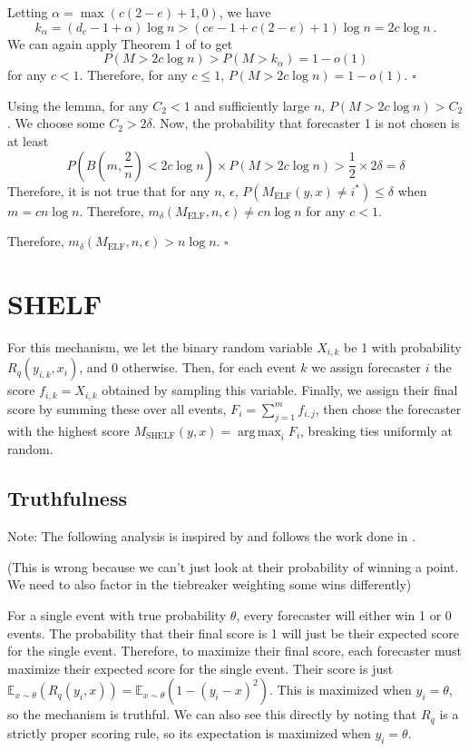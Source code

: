 \documentclass[letterpaper,12pt]{article}
\DeclareMathOperator*{\argmax}{arg\,max}
\newcommand{\E}{\mathbb{E}}
\newcommand{\1}{\mathbbm{1}}
\newcommand*{\QED}{\hfill\ensuremath{\square}}%
\newcommand{\elf}{M_{\mathrm{ELF}}}
\newcommand{\shelf}{M_{\mathrm{SHELF}}}
\begin{document}
Letting $\alpha = \max (c (2-e) + 1, 0)$, we have
\[
k_\alpha = (d_c - 1 + \alpha) \log n > (ce - 1 + c (2-e) + 1) \log n = 2c \log n \:.
\]
We can again apply Theorem 1 of \citet{raab1998balls} to get
\[
P(M > 2 c \log n) > P(M > k_\alpha) = 1 - o(1)
\]
for any $c < 1$. Therefore, for any $c \leq 1$, $P(M > 2 c \log n) = 1 - o(1)$. \hfill \QED

Using the lemma, for any $C_2 < 1$ and sufficiently large $n$, $P(M > 2 c \log n) > C_2$. We choose some $C_2 > 2\delta$. Now, the probability that forecaster 1 is not chosen is at least
\[
  P\left(B\left(m, \frac{2}{n}\right) < 2c \log n\right) \times P(M > 2 c \log n) > \frac{1}{2} \times 2\delta = \delta
\]
Therefore, it is not true that for any $n$, $\epsilon$, $P(\elf(y, x) \neq i^*) \leq \delta$ when $m = c n \log n$. Therefore, $m_\delta(\elf, n, \epsilon) \neq c n \log n$ for any $c < 1$. 

Therefore, $m_\delta(\elf, n, \epsilon) > n \log n$. 
\hfill \QED

\section{SHELF}

For this mechanism, we let the binary random variable $X_{i, k}$ be 1 with probability $R_q(y_{i, k}, x_i)$, and 0 otherwise. Then, for each event $k$ we assign forecaster $i$ the score $f_{i, k} = X_{i, k}$ obtained by sampling this variable. Finally, we assign their final score by summing these over all events, $F_i = \sum_{j=1}^m f_{i, j}$, then chose the forecaster with the highest score $\shelf(y, x) = \argmax_i F_i$, breaking ties uniformly at random. 

\subsection{Truthfulness}
Note: The following analysis is inspired by and follows the work done in \citet{witkowski2018incentive}.


(This is wrong because we can't just look at their probability of winning a point. We need to also factor in the tiebreaker weighting some wins differently)

For a single event with true probability $\theta$, every forecaster will either win 1 or 0 events. The probability that their final score is 1 will just be their expected score for the single event. Therefore, to maximize their final score, each forecaster must maximize their expected score for the single event. Their score is just $\E_{x \sim \theta}(R_q(y_i, x)) = \E_{x \sim \theta}(1 - (y_i - x)^2)$. This is maximized when $y_i = \theta$, so the mechanism is truthful. We can also see this directly by noting that $R_q$ is a strictly proper scoring rule, so its expectation is maximized when $y_i = \theta$. 
\end{document}
